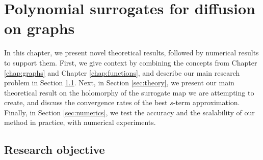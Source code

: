 \documentclass[12pt, oneside]{report}   	%
\begin{document}
\newpage

\chapter{Polynomial surrogates for diffusion on graphs}
\label{chap:research}

In this chapter, we present novel theoretical results, followed by numerical results to support them. First, we give context by combining the concepts from Chapter \ref{chap:graphs} and Chapter \ref{chap:functions}, and describe our main research problem in Section \ref{sec:goal}. Next, in Section \ref{sec:theory}, we present our main theoretical result on the holomorphy of the surrogate map we are attempting to create, and discuss the convergence rates of the best $s$-term approximation. Finally, in Section \ref{sec:numerics}, we test the accuracy and the scalability of our method in practice, with numerical experiments.

\section{Research objective}
\label{sec:goal}
\end{document}
